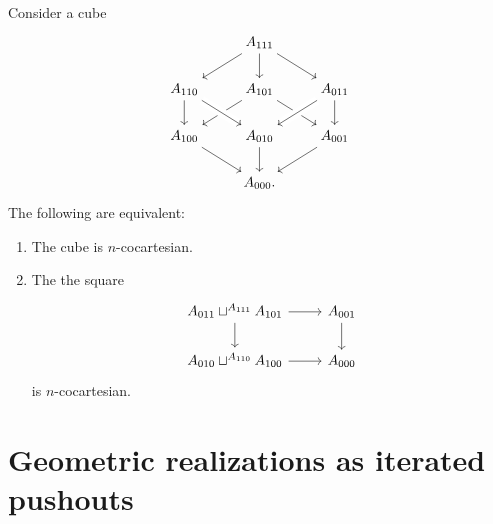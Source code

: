 \begin{conj}
Consider a cube
\begin{equation*}
\begin{tikzcd}
& A_{111} \arrow[dl] \arrow[d] \arrow[dr] \\
A_{110} \arrow[d] & A_{101} \arrow[dl] \arrow[dr] & A_{011} \arrow[d] \\
A_{100} \arrow[dr] & A_{010} \arrow[d] \arrow[from=ul,crossing over] \arrow[from=ur,crossing over] & A_{001} \arrow[dl] \\
& A_{000}.
\end{tikzcd}
\end{equation*}
The following are equivalent:
\begin{enumerate}
\item The cube is $n$-cocartesian.
\item The the square
\begin{equation*}
\begin{tikzcd}
A_{011}\sqcup^{A_{111}} A_{101} \arrow[r] \arrow[d] & A_{001} \arrow[d] \\
A_{010}\sqcup^{A_{110}} A_{100} \arrow[r] & A_{000}
\end{tikzcd}
\end{equation*}
is $n$-cocartesian.
\end{enumerate}
\end{conj}

\section{Geometric realizations as iterated pushouts}

